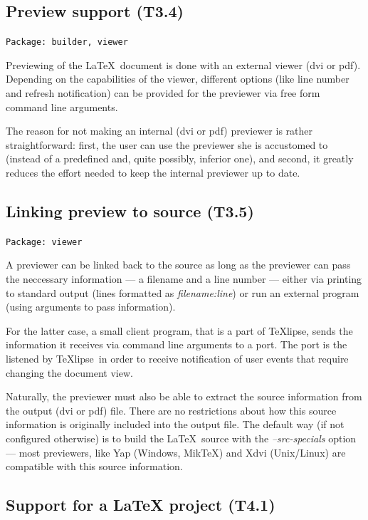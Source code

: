 \documentclass[a4paper,11pt,twoside]{article}
\newcommand{\texlipse}{\TeX lipse}
\begin{document}
\subsection{Preview support (T3.4)}
\label{sect:t3.4}

\texttt{Package: builder, viewer}

Previewing of the \LaTeX\ document is done with an external viewer (dvi or 
pdf). Depending on the capabilities of the viewer, different options (like line 
number and refresh notification) can be provided for the previewer via free 
form command line arguments.

The reason for not making an internal (dvi or pdf) previewer is rather 
straightforward: first, the user can use the previewer she is accustomed to 
(instead of a predefined and, quite possibly, inferior one), and second, it
greatly reduces the effort needed to keep the internal previewer up to date.


\subsection{Linking preview to source (T3.5)}

\texttt{Package: viewer}

A previewer can be linked back to the source as long as the previewer can pass 
the neccessary information --- a filename and a line number --- either via 
printing to standard output (lines formatted as {\em filename:line}) or run an 
external program (using arguments to pass information).

For the latter case, a small client program, that is a part of \texlipse , 
sends the information it receives via command line arguments to a port. The 
port is the listened by \texlipse\ in order to receive notification of user 
events that require changing the document view.

Naturally, the previewer must also be able to extract the source information 
from the output (dvi or pdf) file. There are no restrictions about how this 
source information is originally included into the output file. The default 
way (if not configured otherwise) is to build the \LaTeX\ source with the {\it 
--src-specials} option --- most previewers, like Yap (Windows, MikTeX) and Xdvi 
(Unix/Linux) are compatible with this source information.


\subsection{Support for a LaTeX project (T4.1)}
\label{sec:t4.1}
\end{document}
